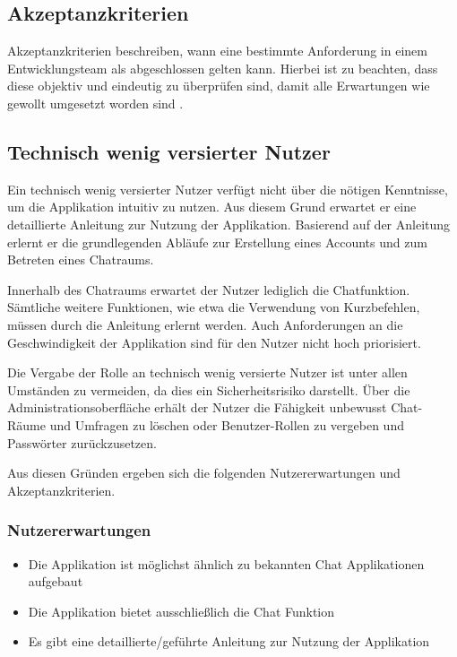 \subsection{Akzeptanzkriterien}
Akzeptanzkriterien beschreiben, wann eine bestimmte Anforderung in einem Entwicklungsteam als abgeschlossen gelten kann.
Hierbei ist zu beachten, dass diese objektiv und eindeutig zu überprüfen sind, damit alle Erwartungen wie gewollt umgesetzt worden sind \autocite[vgl.][S. ]{noauthor_akzeptanzkriterien_nodate}.

\subsection{Technisch wenig versierter Nutzer}
Ein technisch wenig versierter Nutzer verfügt nicht über die nötigen Kenntnisse, um die Applikation intuitiv zu nutzen.
Aus diesem Grund erwartet er eine detaillierte Anleitung zur Nutzung der Applikation.
Basierend auf der Anleitung erlernt er die grundlegenden Abläufe zur Erstellung eines Accounts und zum Betreten eines Chatraums.

\noindent{}Innerhalb des Chatraums erwartet der Nutzer lediglich die Chatfunktion.
Sämtliche weitere Funktionen, wie etwa die Verwendung von Kurzbefehlen, müssen durch die Anleitung erlernt werden.
Auch Anforderungen an die Geschwindigkeit der Applikation sind für den Nutzer nicht hoch priorisiert.

\noindent{}Die Vergabe der  Rolle an technisch wenig versierte Nutzer ist unter allen Umständen zu vermeiden, da dies ein Sicherheitsrisiko darstellt.
Über die Administrationsoberfläche erhält der Nutzer die Fähigkeit unbewusst Chat-Räume und Umfragen zu löschen oder Benutzer-Rollen zu vergeben und Passwörter zurückzusetzen.

\noindent{}Aus diesen Gründen ergeben sich die folgenden Nutzererwartungen und Akzeptanzkriterien.

\subsubsection{Nutzererwartungen}
\begin{itemize}
  \item Die Applikation ist möglichst ähnlich zu bekannten Chat Applikationen aufgebaut
  \item Die Applikation bietet ausschließlich die Chat Funktion
  \item Es gibt eine detaillierte/geführte Anleitung zur Nutzung der Applikation
\end{itemize}

